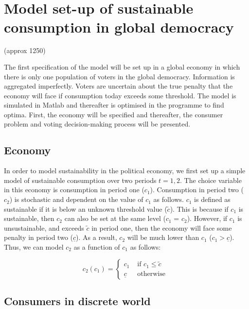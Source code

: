 \documentclass[11pt,preprint, authoryear]{elsarticle}
\numberwithin{equation}{section}
\numberwithin{figure}{section}
\numberwithin{table}{section}
\begin{document}
\hypertarget{model-set-up-of-sustainable-consumption-in-global-democracy}{%
\section{Model set-up of sustainable consumption in global
democracy}\label{model-set-up-of-sustainable-consumption-in-global-democracy}}

(approx 1250)

The first specification of the model will be set up in a global economy
in which there is only one population of voters in the global democracy.
Information is aggregated imperfectly. Voters are uncertain about the
true penalty that the economy will face if consumption today exceeds
some threshold. The model is simulated in Matlab and thereafter is
optimised in the programme to find optima. First, the economy will be
specified and thereafter, the consumer problem and voting
decision-making process will be presented.

\hypertarget{economy}{%
\subsection*{Economy}\label{economy}}

In order to model sustainability in the political economy, we first set
up a simple model of sustainable consumption over two periods
\(t = 1, 2\). The choice variable in this economy is consumption in
period one (\(c_1\)). Consumption in period two (\(c_2\)) is stochastic
and dependent on the value of \(c_1\) as follows. \(c_1\) is defined as
sustainable if it is below an unknown threshold value (\(\tilde{c}\)).
This is because if \(c_1\) is sustainable, then \(c_2\) can also be set
at the same level (\(c_1\) = \(c_2\)). However, if \(c_1\) is
unsustainable, and exceeds \(\tilde{c}\) in period one, then the economy
will face some penalty in period two (\(\underline{c}\)). As a result,
\(c_2\) will be much lower than \(c_1\) (\(c_1> \underline{c}\)). Thus,
we can model \(c_2\) as a function of \(c_1\) as follows:

\[
c_2\left(c_1\right)= \begin{cases}c_1 & \text { if } c_1 \leq \tilde{c} \\ \underline{c} & \text { otherwise }\end{cases}
\]

\hypertarget{consumers-in-discrete-world}{%
\subsection*{Consumers in discrete
world}\label{consumers-in-discrete-world}}
\end{document}
